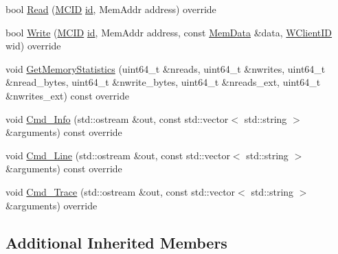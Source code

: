\begin{DoxyCompactItemize}
bool \hyperlink{class_simulator_1_1_z_l_c_d_m_a_ac9c616795b26a9957b574c5ab7df6739}{Read} (\hyperlink{namespace_simulator_a4b5747ff30c62c6373badf3b53b9abf7}{M\+C\+I\+D} \hyperlink{mtconf_8c_aa3185401f04d30bd505daebf48c39cc5}{id}, Mem\+Addr address) override
\item 
bool \hyperlink{class_simulator_1_1_z_l_c_d_m_a_a8c6a79696a2c98b91c3d76dbf4702a75}{Write} (\hyperlink{namespace_simulator_a4b5747ff30c62c6373badf3b53b9abf7}{M\+C\+I\+D} \hyperlink{mtconf_8c_aa3185401f04d30bd505daebf48c39cc5}{id}, Mem\+Addr address, const \hyperlink{struct_simulator_1_1_mem_data}{Mem\+Data} \&data, \hyperlink{namespace_simulator_a0de605c35951a450d074222efcef6359}{W\+Client\+I\+D} wid) override
\item 
void \hyperlink{class_simulator_1_1_z_l_c_d_m_a_a99079d537fdbc6e1b88cc60b7d731e40}{Get\+Memory\+Statistics} (uint64\+\_\+t \&nreads, uint64\+\_\+t \&nwrites, uint64\+\_\+t \&nread\+\_\+bytes, uint64\+\_\+t \&nwrite\+\_\+bytes, uint64\+\_\+t \&nreads\+\_\+ext, uint64\+\_\+t \&nwrites\+\_\+ext) const override
\item 
void \hyperlink{class_simulator_1_1_z_l_c_d_m_a_a7e09ebc6c10dececd41bfe5b7421177c}{Cmd\+\_\+\+Info} (std\+::ostream \&out, const std\+::vector$<$ std\+::string $>$ \&arguments) const override
\item 
void \hyperlink{class_simulator_1_1_z_l_c_d_m_a_a694e1148e9d9e5159804778717f724ff}{Cmd\+\_\+\+Line} (std\+::ostream \&out, const std\+::vector$<$ std\+::string $>$ \&arguments) const override
\item 
void \hyperlink{class_simulator_1_1_z_l_c_d_m_a_aa39484f09d0e6daac62960b2c46e150b}{Cmd\+\_\+\+Trace} (std\+::ostream \&out, const std\+::vector$<$ std\+::string $>$ \&arguments) override
\end{DoxyCompactItemize}
\subsection*{Additional Inherited Members}


